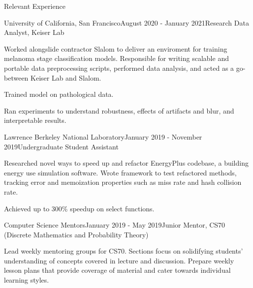 \documentclass{resume}
\begin{document}
\begin{rSection}{Relevant Experience}

\begin{rSubsection}{University of California, San Francisco}{August 2020 - January 2021}{Research Data Analyst, Keiser Lab}{}
\item Worked alongslide contractor Slalom to deliver an enviroment for training melanoma stage classification models. Responsible for writing scalable and portable data preprocessing scripts, performed data analysis, and acted as a go-between Keiser Lab and Slalom.
\item Trained model on pathological data.
\item Ran experiments to understand robustness, effects of artifacts and blur, and interpretable results.
\end{rSubsection}

\begin{rSubsection}{Lawrence Berkeley National Laboratory}{January 2019 - November 2019}{Undergraduate Student Assistant}{}
\item Researched novel ways to speed up and refactor EnergyPlus codebase, a building energy use simulation software. Wrote framework to test refactored methods, tracking
error and memoization properties such as miss rate and hash collision rate. 
\item Achieved up to 300\% speedup on select functions. 
\end{rSubsection}



\begin{rSubsection}{Computer Science Mentors}{January 2019 - May 2019}{Junior Mentor, CS70 (Discrete Mathematics and Probability Theory)}{}
\item Lead weekly mentoring groups for CS70. Sections focus on solidifying students’ understanding of concepts covered in lecture and discussion. Prepare weekly lesson plans that provide coverage of material and cater towards individual learning
styles.
\end{rSubsection}

\end{rSection}


\end{document}
